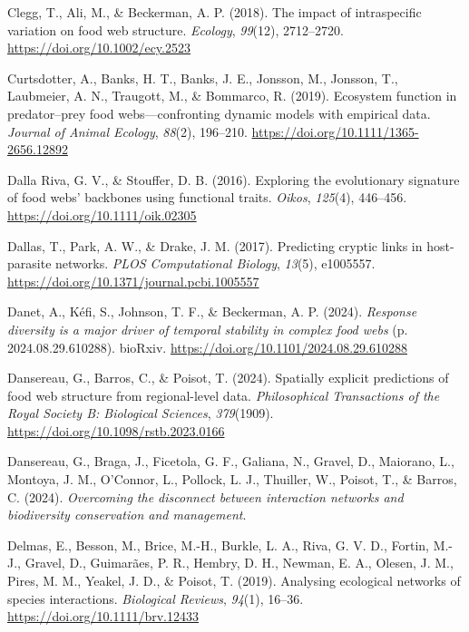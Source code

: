 \documentclass[
]{article}
\newlength{\cslhangindent}
\newenvironment{CSLReferences}[2] %
 {\begin{list}{}{%
  \setlength{\itemindent}{0pt}
  \setlength{\leftmargin}{0pt}
  \setlength{\parsep}{0pt}
  \ifodd #1
   \setlength{\leftmargin}{\cslhangindent}
   \setlength{\itemindent}{-1\cslhangindent}
  \fi
  \setlength{\itemsep}{#2\baselineskip}}}
 {\end{list}}
\begin{document}
\begin{CSLReferences}{1}{0}
Clegg, T., Ali, M., \& Beckerman, A. P. (2018). The impact of
intraspecific variation on food web structure. \emph{Ecology},
\emph{99}(12), 2712--2720. \url{https://doi.org/10.1002/ecy.2523}

Curtsdotter, A., Banks, H. T., Banks, J. E., Jonsson, M., Jonsson, T.,
Laubmeier, A. N., Traugott, M., \& Bommarco, R. (2019). Ecosystem
function in predator--prey food webs---confronting dynamic models with
empirical data. \emph{Journal of Animal Ecology}, \emph{88}(2),
196--210. \url{https://doi.org/10.1111/1365-2656.12892}

Dalla Riva, G. V., \& Stouffer, D. B. (2016). Exploring the evolutionary
signature of food webs' backbones using functional traits. \emph{Oikos},
\emph{125}(4), 446--456. \url{https://doi.org/10.1111/oik.02305}

Dallas, T., Park, A. W., \& Drake, J. M. (2017). Predicting cryptic
links in host-parasite networks. \emph{PLOS Computational Biology},
\emph{13}(5), e1005557.
\url{https://doi.org/10.1371/journal.pcbi.1005557}

Danet, A., Kéfi, S., Johnson, T. F., \& Beckerman, A. P. (2024).
\emph{Response diversity is a major driver of temporal stability in
complex food webs} (p. 2024.08.29.610288). bioRxiv.
\url{https://doi.org/10.1101/2024.08.29.610288}

Dansereau, G., Barros, C., \& Poisot, T. (2024). Spatially explicit
predictions of food web structure from regional-level data.
\emph{Philosophical Transactions of the Royal Society B: Biological
Sciences}, \emph{379}(1909).
\url{https://doi.org/10.1098/rstb.2023.0166}

Dansereau, G., Braga, J., Ficetola, G. F., Galiana, N., Gravel, D.,
Maiorano, L., Montoya, J. M., O'Connor, L., Pollock, L. J., Thuiller,
W., Poisot, T., \& Barros, C. (2024). \emph{Overcoming the disconnect
between interaction networks and biodiversity conservation and
management}.

Delmas, E., Besson, M., Brice, M.-H., Burkle, L. A., Riva, G. V. D.,
Fortin, M.-J., Gravel, D., Guimarães, P. R., Hembry, D. H., Newman, E.
A., Olesen, J. M., Pires, M. M., Yeakel, J. D., \& Poisot, T. (2019).
Analysing ecological networks of species interactions. \emph{Biological
Reviews}, \emph{94}(1), 16--36. \url{https://doi.org/10.1111/brv.12433}


\end{CSLReferences}
\end{document}
